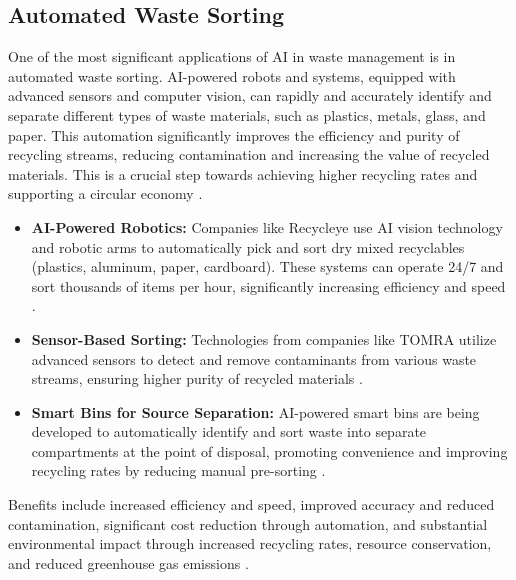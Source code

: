 \subsection{Automated Waste Sorting}
One of the most significant applications of AI in waste management is in automated waste sorting. AI-powered robots and systems, equipped with advanced sensors and computer vision, can rapidly and accurately identify and separate different types of waste materials, such as plastics, metals, glass, and paper. This automation significantly improves the efficiency and purity of recycling streams, reducing contamination and increasing the value of recycled materials. This is a crucial step towards achieving higher recycling rates and supporting a circular economy \cite{sharma2023wastemanagement}.
\begin{itemize}
    \item \textbf{AI-Powered Robotics:} Companies like Recycleye use AI vision technology and robotic arms to automatically pick and sort dry mixed recyclables (plastics, aluminum, paper, cardboard). These systems can operate 24/7 and sort thousands of items per hour, significantly increasing efficiency and speed \cite{Recycleye_Sorting_1, Recycleye_Sorting_2}.
    \item \textbf{Sensor-Based Sorting:} Technologies from companies like TOMRA utilize advanced sensors to detect and remove contaminants from various waste streams, ensuring higher purity of recycled materials \cite{TOMRA_Sorting}.
    \item \textbf{Smart Bins for Source Separation:} AI-powered smart bins are being developed to automatically identify and sort waste into separate compartments at the point of disposal, promoting convenience and improving recycling rates by reducing manual pre-sorting \cite{HundredOrg_Sorting, BlueSkyCreations_Sorting}.
\end{itemize}
Benefits include increased efficiency and speed, improved accuracy and reduced contamination, significant cost reduction through automation, and substantial environmental impact through increased recycling rates, resource conservation, and reduced greenhouse gas emissions \cite{SWANA_Sorting, MyMatrCorp_Sorting}.

